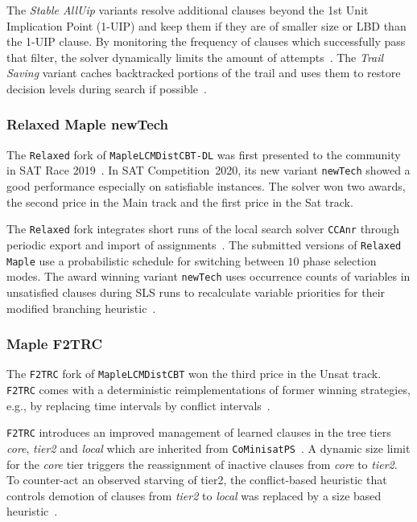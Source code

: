 \documentclass{elsarticle}
\newcommand{\solver}[1]{\texttt{#1}}
\begin{document}
The \emph{Stable AllUip} variants resolve additional clauses beyond the 1st Unit Implication Point (1-UIP) and keep them if they are of smaller size or LBD than the 1-UIP clause. 
By monitoring the frequency of clauses which successfully pass that filter, the solver dynamically limits the amount of attempts~\cite{Zhang:2001:ClauseLearning,Bacchus:SC2020}.
The \emph{Trail Saving} variant caches backtracked portions of the trail and uses them to restore decision levels during search if possible~\cite{Hickey:2020:TrailSaving}. 


\subsubsection{Relaxed Maple newTech}

The \solver{Relaxed} fork of \solver{MapleLCMDistCBT-DL} was first presented to the community in SAT Race 2019~\cite{Xindi:SC2019}. 
In SAT Competition~2020, its new variant \solver{newTech} showed a good performance especially on satisfiable instances. 
The solver won two awards, the second price in the Main track and the first price in the Sat track.

The \solver{Relaxed} fork integrates short runs of the local search solver \solver{CCAnr} through periodic export and import of assignments~\cite{Xindi:SC2019}. 
The submitted versions of \solver{Relaxed Maple} use a probabilistic schedule for switching between $10$ phase selection modes. 
The award winning variant \solver{newTech} uses occurrence counts of variables in unsatisfied clauses during SLS runs to recalculate variable priorities for their modified branching heuristic~\cite{Xindi:SC2020}. 


\subsubsection{Maple F2TRC}

The \solver{F2TRC} fork of \solver{MapleLCMDistCBT} won the third price in the Unsat track. 
\solver{F2TRC} comes with a deterministic reimplementations of former winning strategies, e.g., by replacing time intervals by conflict intervals~\cite{Kochemazov:SC2020}. 

\solver{F2TRC} introduces an improved management of learned clauses in the tree tiers \emph{core}, \emph{tier2} and \emph{local} which are inherited from \solver{CoMinisatPS}~\cite{Oh:2015:satunsat}.
A dynamic size limit for the \emph{core} tier triggers the reassignment of inactive clauses from \emph{core} to \emph{tier2}. 
To counter-act an observed starving of tier2, the conflict-based heuristic that controls demotion of clauses from \emph{tier2} to \emph{local} was replaced by a size based heuristic~\cite{Kochemazov:SC2020}. 
\end{document}
